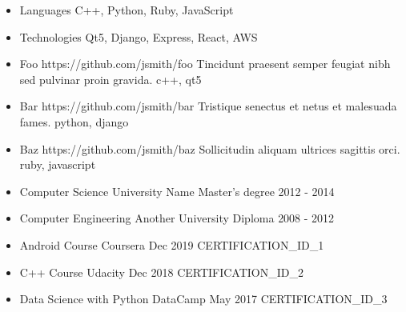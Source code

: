 \documentclass{src/main}
\begin{document}

\newpage

 {
    \begin{itemize}
        \item \gitem
            {Languages}
            {C++, Python, Ruby, JavaScript}
        \item \gitem
            {Technologies}
            {Qt5, Django, Express, React, AWS}
    \end{itemize}
}
 {
    \begin{itemize}
        \item \gproject
            {Foo}
            {https://github.com/jsmith/foo}
            {Tincidunt praesent semper feugiat nibh sed pulvinar proin gravida.}
            {c++, qt5}
        \item \gproject
            {Bar}
            {https://github.com/jsmith/bar}
            {Tristique senectus et netus et malesuada fames.}
            {python, django}
        \item \gproject
            {Baz}
            {https://github.com/jsmith/baz}
            {Sollicitudin aliquam ultrices sagittis orci.}
            {ruby, javascript}
    \end{itemize}
}
 {
    \begin{itemize}
        \item \geducation
            {Computer Science}
            {University Name}
            {Master's degree}
            {2012 - 2014}
        \item \geducation
            {Computer Engineering}
            {Another University}
            {Diploma}
            {2008 - 2012}
    \end{itemize}
}
 {
    \begin{itemize}
        \item \gcertification
            {Android Course}
            {Coursera}
            {Dec 2019}
            {CERTIFICATION\_ID\_1}
        \item \gcertification
            {C++ Course}
            {Udacity}
            {Dec 2018}
            {CERTIFICATION\_ID\_2}
        \item \gcertification
            {Data Science with Python}
            {DataCamp}
            {May 2017}
            {CERTIFICATION\_ID\_3}
    \end{itemize}
}


\end{document}
